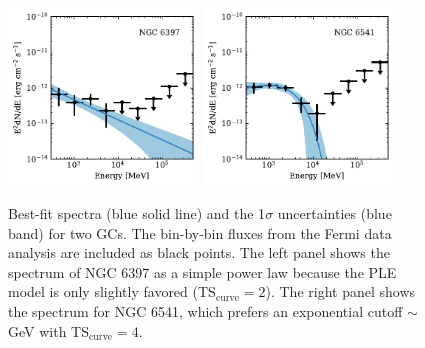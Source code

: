 \documentclass[doublespace,nopageskip]{VTthesis} %
\begin{document}
\begin{figure}[htb]
    \centering
    \includegraphics[width=0.45\textwidth]{Figures/Globular/spectra/PL_spectrum_16.pdf}
    \includegraphics[width=0.45\textwidth]{Figures/Globular/spectra/PLE_spectrum_21.pdf}
    \caption{Best-fit spectra (blue solid line) and the 1$\sigma$ uncertainties (blue band) for two GCs. The bin-by-bin fluxes from the Fermi data analysis are included as black points. The left panel shows the spectrum of NGC 6397 as a simple power law because the PLE model is only slightly favored (TS$_\mathrm{curve} = 2$). The right panel shows the spectrum for NGC 6541, which prefers an exponential cutoff $\sim$ GeV with TS$_\mathrm{curve} = 4$.}
    \label{fig:spectra_example}
\end{figure}
\end{document}

